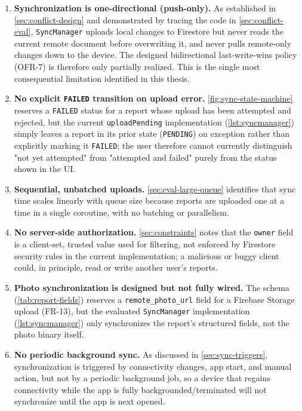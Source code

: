 \begin{enumerate}
  \item \textbf{Synchronization is one-directional (push-only).} As
  established in \cref{sec:conflict-design} and demonstrated by tracing
  the code in \cref{sec:conflict-eval}, \texttt{SyncManager} uploads local
  changes to Firestore but never reads the current remote document before
  overwriting it, and never pulls remote-only changes down to the device.
  The designed bidirectional last-write-wins policy (OFR-7) is therefore
  only partially realized. This is the single most consequential
  limitation identified in this thesis.
  \item \textbf{No explicit \texttt{FAILED} transition on upload error.}
  \cref{fig:sync-state-machine} reserves a \texttt{FAILED} status for a
  report whose upload has been attempted and rejected, but the current
  \texttt{uploadPending} implementation (\cref{lst:syncmanager}) simply
  leaves a report in its prior state (\texttt{PENDING}) on exception
  rather than explicitly marking it \texttt{FAILED}; the user therefore
  cannot currently distinguish "not yet attempted" from "attempted and
  failed" purely from the status shown in the UI.
  \item \textbf{Sequential, unbatched uploads.} \cref{sec:eval-large-queue}
  identifies that sync time scales linearly with queue size because
  reports are uploaded one at a time in a single coroutine, with no
  batching or parallelism.
  \item \textbf{No server-side authorization.} \cref{sec:constraints}
  notes that the \texttt{owner} field is a client-set, trusted value used
  for filtering, not enforced by Firestore security rules in the current
  implementation; a malicious or buggy client could, in principle, read or
  write another user's reports.
  \item \textbf{Photo synchronization is designed but not fully wired.}
  The schema (\cref{tab:report-fields}) reserves a
  \texttt{remote\_photo\_url} field for a Firebase Storage upload (FR-13),
  but the evaluated \texttt{SyncManager} implementation
  (\cref{lst:syncmanager}) only synchronizes the report's structured
  fields, not the photo binary itself.
  \item \textbf{No periodic background sync.} As discussed in
  \cref{sec:sync-triggers}, synchronization is triggered by connectivity
  changes, app start, and manual action, but not by a periodic background
  job, so a device that regains connectivity while the app is fully
  backgrounded/terminated will not synchronize until the app is next
  opened.
\end{enumerate}

